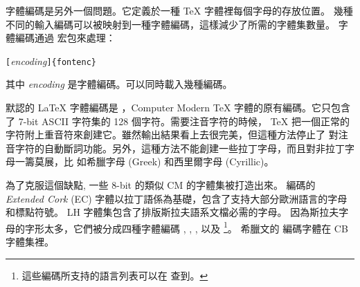 字體編碼是另外一個問題。它定義於一種 \TeX{} 字體裡每個字母的存放位置。
幾種不同的輸入編碼可以被映射到一種字體編碼，這樣減少了所需的字體集數量。
字體編碼通過  宏包來處理：\label{fontenc}
\begin{lscommand}
\verb|[|\emph{encoding}\verb|]{fontenc}| 
\end{lscommand}
\noindent 其中 \emph{encoding} 是字體編碼。可以同時載入幾種編碼。

默認的 \LaTeX{} 字體編碼是 \label{OT1}，Computer Modern
\TeX{} 字體的原有編碼。它只包含了 7-bit ASCII 字符集的 128 個字符。需要注音字符的時候，
\TeX{} 把一個正常的字符附上重音符來創建它。雖然輸出結果看上去很完美，但這種方法停止了
對注音字符的自動斷詞功能。另外，這種方法不能創建一些拉丁字母，而且對非拉丁字母一籌莫展，比
如希臘字母 (Greek) 和西里爾字母 (Cyrillic)。

為了克服這個缺點, 一些 8-bit 的類似 CM 的字體集被打造出來。
 編碼的 \emph{Extended
Cork} (EC) 字體以拉丁語係為基礎，包含了支持大部分歐洲語言的字母和標點符號。
LH 字體集包含了排版斯拉夫語系文檔必需的字母。
因為斯拉夫字母的字形太多，它們被分成四種字體編碼 \pozhehao {},
, ,
以及 \footnote{這些編碼所支持的語言列表可以在 \cite{cyrguide} 查到。}。
希臘文的  編碼字體在 CB 字體集裡。

